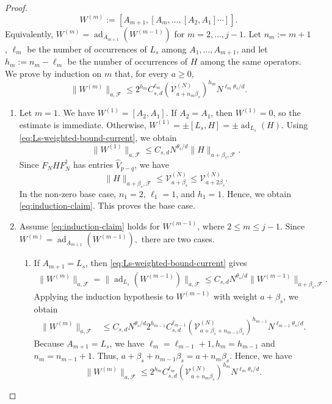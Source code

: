 \documentclass[10pt,reqno]{article}
\numberwithin{equation}{section}
\theoremstyle{plain}
\theoremstyle{definition}
\begin{document}
\begin{proof}
\begin{equation}
W^{(m)} := [A_{m+1},[A_m,\dots,[A_2,A_1]\cdots]].
\end{equation}
Equivalently, \(W^{(m)}=\operatorname{ad}_{A_{m+1}}(W^{(m-1)})\) for \(m=2,\dots,j-1\). Let \(n_m:=m+1\), \(\ell_m\) be the number of occurrences of \(L_s\) among \(A_1,\dots,A_{m+1}\), and let \(h_m:=n_m-\ell_m\) be the number of occurrences of \(H\) among the same operators. We prove by induction on \(m\) that, for every \(a\geq0\),
\begin{equation}\label{eq:induction-claim}
\|W^{(m)}\|_{a,\mathcal F} \leq 2^{h_m} C_{s,d}^{\ell_m} (\mathcal V_{a+n_m\beta_s}^{(N)} )^{h_m} N^{\ell_m\theta_s/d}.
\end{equation}
\begin{enumerate}
\item Let \(m=1\). We have $W^{(1)}=[A_2,A_1]$. If \(A_2=A_1\), then \(W^{(1)}=0\), so the estimate is immediate. Otherwise, \(W^{(1)} = \pm [L_s,H] = \pm \operatorname{ad}_{L_s}(H)\). Using \cref{eq:Ls-weighted-bound-current}, we obtain
\begin{equation}
\|W^{(1)}\|_{a,\mathcal F} \leq C_{s,d}N^{\theta_s/d} \|H\|_{a+\beta_s,\mathcal F}.
\end{equation}
Since \(F_NHF_N^\dagger\) has entries \(\widehat V_{p-q}\), we have
\begin{equation}
\|H\|_{a+\beta_s,\mathcal F} \leq \mathcal V_{a+\beta_s}^{(N)} \leq \mathcal V_{a+2\beta_s}^{(N)}.
\end{equation}
In the non-zero base case, \(n_1=2\), \(\ell_1=1\), and \(h_1=1\). Hence, we obtain \cref{eq:induction-claim}. This proves the base case.

\item Assume \cref{eq:induction-claim} holds for \(W^{(m-1)}\), where \(2\leq m\leq j-1\). Since $W^{(m)} = \operatorname{ad}_{A_{m+1}}(W^{(m-1)}),$ there are two cases.
\begin{enumerate}
\item If \(A_{m+1}=L_s\), then \cref{eq:Ls-weighted-bound-current} gives
\begin{align}
\|W^{(m)}\|_{a,\mathcal F} = \|\operatorname{ad}_{L_s}(W^{(m-1)})\|_{a,\mathcal F} \leq C_{s,d}N^{\theta_s/d} \|W^{(m-1)}\|_{a+\beta_s,\mathcal F}.
\end{align}
Applying the induction hypothesis to \(W^{(m-1)}\) with weight \(a+\beta_s\), we obtain
\begin{align}
\|W^{(m)}\|_{a,\mathcal F} &\leq C_{s,d}N^{\theta_s/d} 2^{h_{m-1}} C_{s,d}^{\ell_{m-1}} ( \mathcal V_{a+\beta_s+n_{m-1}\beta_s}^{(N)} )^{h_{m-1}} N^{\ell_{m-1}\theta_s/d}.
\end{align}
Because \(A_{m+1}=L_s\), we have $\ell_m=\ell_{m-1}+1, h_m=h_{m-1}$ and $n_m=n_{m-1}+1$. Thus, $a+\beta_s+n_{m-1}\beta_s=a+n_m\beta_s$. Hence, we have
\begin{equation}
\|W^{(m)}\|_{a,\mathcal F} \leq 2^{h_m} C_{s,d}^{\ell_m} ( \mathcal V_{a+n_m\beta_s}^{(N)})^{h_m} N^{\ell_m\theta_s/d}.
\end{equation}


\end{enumerate}
\end{enumerate}
\end{proof}
\end{document}
